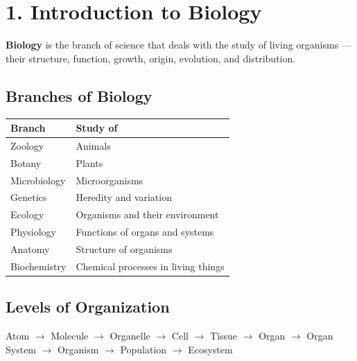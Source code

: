 \documentclass[12pt]{article}
\newcommand{\hcell}[1]{\textbf{\color{white}#1}}
\begin{document}
\begin{tcolorbox}[enhanced, arc=4pt, boxrule=1.5pt, colback=white, colframe=primary,
  left=10pt, right=10pt, top=4pt, bottom=8pt,
  title={\bfseries\color{white} Table of Contents}, colbacktitle=primary,
  attach boxed title to top left={xshift=10pt, yshift=-\tcboxedtitleheight/2},
  boxed title style={arc=3pt, colframe=primary, boxrule=0pt}]
\vspace{4pt}\tableofcontents
\end{tcolorbox}
\newpage

\section{1. Introduction to Biology}

\begin{defbox}[Biology]
\textbf{Biology} is the branch of science that deals with the study of living organisms — their structure, function, growth, origin, evolution, and distribution.
\end{defbox}

\subsection{Branches of Biology}
\begin{center}
\renewcommand{\arraystretch}{1.35}
\begin{tabular}{|C{4cm}|C{8.5cm}|}
\hline
{}\hcell{Branch} & \hcell{Study of} \\
\hline
Zoology & Animals \\
 Botany & Plants \\
Microbiology & Microorganisms \\
 Genetics & Heredity and variation \\
Ecology & Organisms and their environment \\
 Physiology & Functions of organs and systems \\
Anatomy & Structure of organisms \\
 Biochemistry & Chemical processes in living things \\
\hline
\end{tabular}
\end{center}

\subsection{Levels of Organization}
\begin{keybox}
Atom $\to$ Molecule $\to$ Organelle $\to$ Cell $\to$ Tissue $\to$ Organ $\to$ Organ System $\to$ Organism $\to$ Population $\to$ Ecosystem
\end{keybox}
\end{document}
